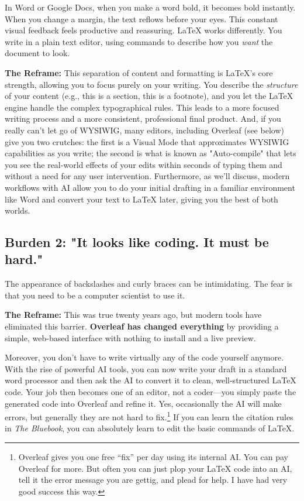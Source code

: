 \documentclass[12pt]{article}
\begin{document}
In Word or Google Docs, when you make a word bold, it becomes bold instantly. When you change a margin, the text reflows before your eyes. This constant visual feedback feels productive and reassuring. LaTeX works differently. You write in a plain text editor, using commands to describe how you \textit{want} the document to look.

\textbf{The Reframe:} This separation of content and formatting is LaTeX's core strength, allowing you to focus purely on your writing. You describe the \textit{structure} of your content (e.g., this is a section, this is a footnote), and you let the LaTeX engine handle the complex typographical rules. This leads to a more focused writing process and a more consistent, professional final product. And, if you really can't let go of WYSIWIG, many editors, including Overleaf (see below) give you two crutches: the first is a Visual Mode that approximates  WYSIWIG capabilities as you write; the second is what is known as "Auto-compile" that lets you see the real-world effects of your edits within seconds of typing them and without a need for any user intervention. Furthermore, as we'll discuss, modern workflows with AI allow you to do your initial drafting in a familiar environment like Word and convert your text to LaTeX later, giving you the best of both worlds.

\subsection{Burden 2: "It looks like coding. It must be hard."}

The appearance of backslashes and curly braces can be intimidating. The fear is that you need to be a computer scientist to use it.

\textbf{The Reframe:} This was true twenty years ago, but modern tools have eliminated this barrier. \textbf{Overleaf has changed everything} by providing a simple, web-based interface with nothing to install and a live preview.

Moreover, you don't have to write virtually any of the code yourself anymore. With the rise of powerful AI tools, you can now write your draft in a standard word processor and then ask the AI to convert it to clean, well-structured LaTeX code. Your job then becomes one of an editor, not a coder—you simply paste the generated code into Overleaf and refine it. Yes, occasionally the AI will make errors, but generally they are not hard to fix.\footnote{Overleaf gives you one free ``fix'' per day using its internal AI. You can pay Overleaf for more. But often you can just plop your LaTeX code into an AI, tell it the error message you are gettig, and plead for help. I have had very good success this way.} If you can learn the citation rules in \textit{The Bluebook}, you can absolutely learn to edit the basic commands of LaTeX.
\end{document}

